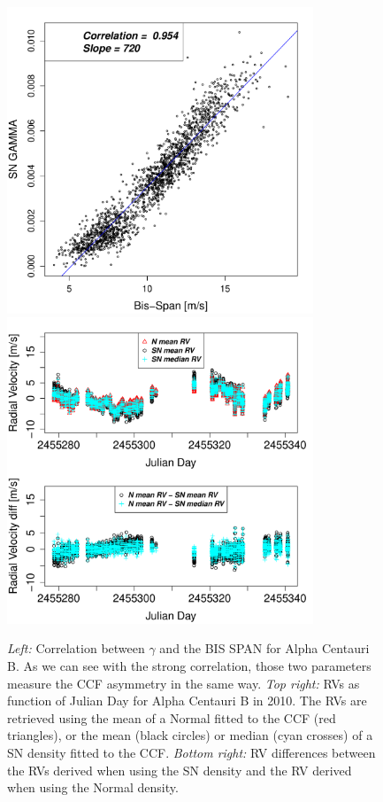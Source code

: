 \documentclass{aa}
\begin{document}
%
\begin{figure}[htbp]
\begin{center}
\includegraphics[height = 3.6in]{HD12862_gamma_vs_bisspan.pdf} 
\includegraphics[height = 3.6in]{HD12862_[2]RadialVelocityDifferences.pdf} 
   \caption{\emph{Left: }Correlation between $\gamma$ and the BIS SPAN for Alpha Centauri B. As we can see with the strong correlation, those two parameters measure the CCF asymmetry in the same way. \emph{Top right:} RVs as function of Julian Day for Alpha Centauri B in 2010. The RVs are retrieved using the mean of a Normal fitted to the CCF (red triangles), or the mean (black circles) or median (cyan crosses) of a SN density fitted to the CCF. \emph{Bottom right:} RV differences between the RVs derived when using the SN density and the RV derived when using the Normal density.}
   \label{fig:alphacent:corr.gamma}
\end{center}
\end{figure}
%
\end{document}
